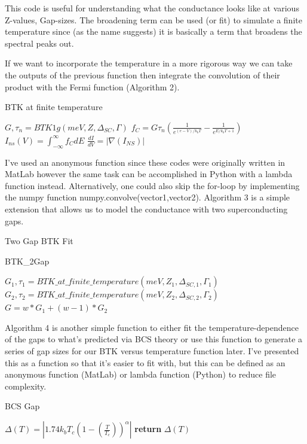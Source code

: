 This code is useful for understanding what the conductance looks like at various Z-values, Gap-sizes. The broadening term can be used (or fit) to simulate a finite temperature since (as the name suggests) it is basically a term that broadens the spectral peaks out.\par
If we want to incorporate the temperature in a more rigorous way we can take the outputs of the previous function then integrate the convolution of their product with the Fermi function (Algorithm 2).
\begin{algorithm}
\caption{BTK at finite temperature}
\begin{algorithmic}[1]
\State $G, \tau_{n} = BTK1g(meV, Z, \Delta_{SC}, \Gamma)$
\State $f_{C} = G\tau_{n}\left(\frac{1}{e^{\left(e-V\right)/k_{b}T}}-\frac{1}{e^{E/k_{b}T+1}}\right)$
\State $I_{ns}(V) = \int_{-\infty}^{\infty}f_{C}dE$
\EndFor
\State $\frac{dI}{dV} = \left|\nabla(I_{NS})\right|$
\end{algorithmic}
\end{algorithm}
I've used an anonymous function since these codes were originally written in MatLab however the same task can be accomplished in Python with a lambda function instead. Alternatively, one could also skip the for-loop by implementing the numpy function numpy.convolve(vector1,vector2). Algorithm 3 is a simple extension that allows us to model the conductance with two superconducting gaps.\par
\begin{algorithm}
\caption{Two Gap BTK Fit}{BTK\_2Gap}
\begin{algorithmic}
\State $G_{1},\tau_{1} = BTK\_at\_finite\_temperature(meV,Z_{1},\Delta_{SC,1},\Gamma_{1})$
\State $G_{2},\tau_{2} = BTK\_at\_finite\_temperature(meV,Z_{2},\Delta_{SC,2},\Gamma_{2})$
\State $G = w*G_{1} + (w-1)*G_{2}$
\end{algorithmic}
\end{algorithm}
Algorithm 4 is another simple function to either fit the temperature-dependence of the gaps to what's predicted via \ac{BCS} theory or use this function to generate a series of gap sizes for our \ac{BTK} versus temperature function later. I've presented this as a function so that it's easier to fit with, but this can be defined as an anonymous function (MatLab) or lambda function (Python) to reduce file complexity. 
\begin{algorithm}
\caption{BCS Gap}\label{euclid}
\begin{algorithmic}[1]
\State $\Delta(T) = \left|1.74k_{b}T_{c}\left(1-\left(\frac{T}{T_{c}}\right)\right)^{\alpha}\right|$
\State \textbf{return} $\Delta(T)$
\EndFunction
\end{algorithmic}
\end{algorithm}
